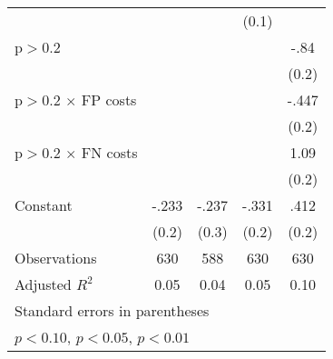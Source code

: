 \begin{table}[htbp]
\begin{tabular}{l*{4}{c}}
                &                  &                  &    (0.1)         &                  \\
p$>$0.2         &                  &                  &                  &     -.84\sym{***}\\
                &                  &                  &                  &    (0.2)         \\
p$>$0.2 $\times$ FP costs&                  &                  &                  &    -.447\sym{***}\\
                &                  &                  &                  &    (0.2)         \\
p$>$0.2 $\times$ FN costs&                  &                  &                  &     1.09\sym{***}\\
                &                  &                  &                  &    (0.2)         \\
Constant        &    -.233         &    -.237         &    -.331         &     .412\sym{*}  \\
                &    (0.2)         &    (0.3)         &    (0.2)         &    (0.2)         \\
\hline
Observations    &      630         &      588         &      630         &      630         \\
Adjusted \(R^{2}\)&     0.05         &     0.04         &     0.05         &     0.10         \\
\hline\hline
\multicolumn{5}{l}{\footnotesize Standard errors in parentheses}\\
\multicolumn{5}{l}{\footnotesize \sym{*} \(p<0.10\), \sym{**} \(p<0.05\), \sym{***} \(p<0.01\)}\\
\end{tabular}
\end{table}
